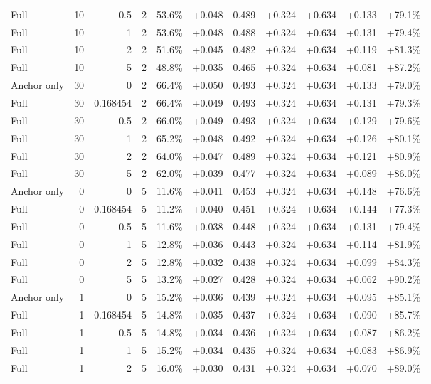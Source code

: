 \begin{table}[htbp]
\begin{tabular}{lrrrccccccc}
Full & 10 & 0.5 & 2 & 53.6\% & +0.048 & 0.489 & +0.324 & +0.634 & +0.133 & +79.1\% \\
Full & 10 & 1 & 2 & 53.6\% & +0.048 & 0.488 & +0.324 & +0.634 & +0.131 & +79.4\% \\
Full & 10 & 2 & 2 & 51.6\% & +0.045 & 0.482 & +0.324 & +0.634 & +0.119 & +81.3\% \\
Full & 10 & 5 & 2 & 48.8\% & +0.035 & 0.465 & +0.324 & +0.634 & +0.081 & +87.2\% \\
Anchor only & 30 & 0 & 2 & 66.4\% & +0.050 & 0.493 & +0.324 & +0.634 & +0.133 & +79.0\% \\
Full & 30 & 0.168454 & 2 & 66.4\% & +0.049 & 0.493 & +0.324 & +0.634 & +0.131 & +79.3\% \\
Full & 30 & 0.5 & 2 & 66.0\% & +0.049 & 0.493 & +0.324 & +0.634 & +0.129 & +79.6\% \\
Full & 30 & 1 & 2 & 65.2\% & +0.048 & 0.492 & +0.324 & +0.634 & +0.126 & +80.1\% \\
Full & 30 & 2 & 2 & 64.0\% & +0.047 & 0.489 & +0.324 & +0.634 & +0.121 & +80.9\% \\
Full & 30 & 5 & 2 & 62.0\% & +0.039 & 0.477 & +0.324 & +0.634 & +0.089 & +86.0\% \\
Anchor only & 0 & 0 & 5 & 11.6\% & +0.041 & 0.453 & +0.324 & +0.634 & +0.148 & +76.6\% \\
Full & 0 & 0.168454 & 5 & 11.2\% & +0.040 & 0.451 & +0.324 & +0.634 & +0.144 & +77.3\% \\
Full & 0 & 0.5 & 5 & 11.6\% & +0.038 & 0.448 & +0.324 & +0.634 & +0.131 & +79.4\% \\
Full & 0 & 1 & 5 & 12.8\% & +0.036 & 0.443 & +0.324 & +0.634 & +0.114 & +81.9\% \\
Full & 0 & 2 & 5 & 12.8\% & +0.032 & 0.438 & +0.324 & +0.634 & +0.099 & +84.3\% \\
Full & 0 & 5 & 5 & 13.2\% & +0.027 & 0.428 & +0.324 & +0.634 & +0.062 & +90.2\% \\
Anchor only & 1 & 0 & 5 & 15.2\% & +0.036 & 0.439 & +0.324 & +0.634 & +0.095 & +85.1\% \\
Full & 1 & 0.168454 & 5 & 14.8\% & +0.035 & 0.437 & +0.324 & +0.634 & +0.090 & +85.7\% \\
Full & 1 & 0.5 & 5 & 14.8\% & +0.034 & 0.436 & +0.324 & +0.634 & +0.087 & +86.2\% \\
Full & 1 & 1 & 5 & 15.2\% & +0.034 & 0.435 & +0.324 & +0.634 & +0.083 & +86.9\% \\
Full & 1 & 2 & 5 & 16.0\% & +0.030 & 0.431 & +0.324 & +0.634 & +0.070 & +89.0\% \\

\end{tabular}
\end{table}
